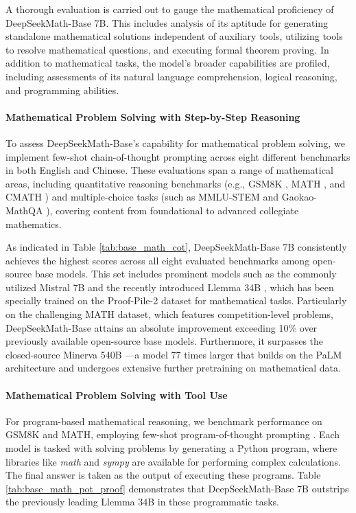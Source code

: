 A thorough evaluation is carried out to gauge the mathematical proficiency of DeepSeekMath-Base 7B. This includes analysis of its aptitude for generating standalone mathematical solutions independent of auxiliary tools, utilizing tools to resolve mathematical questions, and executing formal theorem proving. In addition to mathematical tasks, the model's broader capabilities are profiled, including assessments of its natural language comprehension, logical reasoning, and programming abilities.

\paragraph{Mathematical Problem Solving with Step-by-Step Reasoning}

To assess DeepSeekMath-Base's capability for mathematical problem solving, we implement few-shot chain-of-thought prompting \citep{cot} across eight different benchmarks in both English and Chinese. These evaluations span a range of mathematical areas, including quantitative reasoning benchmarks (e.g., GSM8K \citep{gsm8k}, MATH \citep{MATH}, and CMATH \citep{wei2023cmath}) and multiple-choice tasks (such as MMLU-STEM \citep{mmlu} and Gaokao-MathQA \citep{agieval}), covering content from foundational to advanced collegiate mathematics.

As indicated in Table \ref{tab:base_math_cot}, DeepSeekMath-Base 7B consistently achieves the highest scores across all eight evaluated benchmarks among open-source base models. This set includes prominent models such as the commonly utilized Mistral 7B \citep{mistral} and the recently introduced Llemma 34B \citep{llemma}, which has been specially trained on the Proof-Pile-2 dataset \citep{llemma} for mathematical tasks. Particularly on the challenging MATH dataset, which features competition-level problems, DeepSeekMath-Base attains an absolute improvement exceeding 10\% over previously available open-source base models. Furthermore, it surpasses the closed-source Minerva 540B \citep{minerva}—a model 77 times larger that builds on the PaLM architecture \citep{palm} and undergoes extensive further pretraining on mathematical data.

\paragraph{Mathematical Problem Solving with Tool Use}

For program-based mathematical reasoning, we benchmark performance on GSM8K and MATH, employing few-shot program-of-thought prompting \citep{pot,pal}. Each model is tasked with solving problems by generating a Python program, where libraries like \textit{math} and \textit{sympy} are available for performing complex calculations. The final answer is taken as the output of executing these programs. Table \ref{tab:base_math_pot_proof} demonstrates that DeepSeekMath-Base 7B outstrips the previously leading Llemma 34B in these programmatic tasks.

